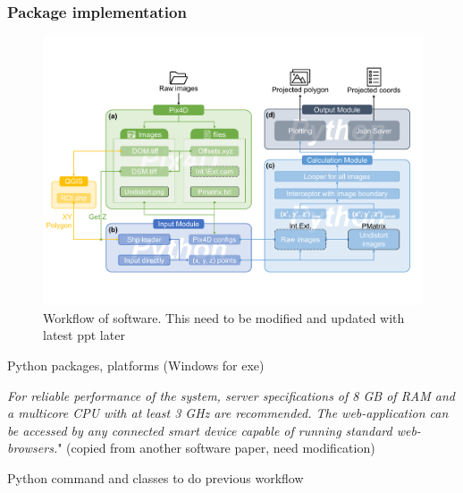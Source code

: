 \documentclass[sensors,article,submit,moreauthors, xelatex]{Definitions/mdpi}
\begin{document}
\subsubsection{Package implementation}

\begin{figure}[H]
  \centering
  \includegraphics[width=0.95\linewidth]{figures/workflow.pdf}
  \caption{Workflow of software. This need to be modified and updated with latest ppt later}
  \label{fig:workflow}
\end{figure}


Python packages, platforms (Windows for exe)

\textit{For reliable performance of the system, server specifications of 8 GB of RAM and a multicore CPU with at least 3 GHz are recommended. The web-application can be accessed by any connected smart device capable of
running standard web-browsers.}" (copied from another software paper, need modification)

Python command and classes to do previous workflow
\end{document}
